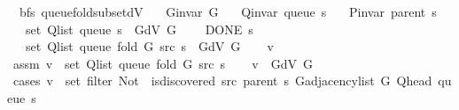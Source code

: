 \begin{isabellebody}
{}
\isamarkuptrue%
%
\endisatagdocument
{\isafolddocument}%
%
\isadelimdocument
%
\endisadelimdocument
{}\isamarkupfalse%
\ {\isacharparenleft}{\kern0pt}\ bfs{\isacharparenright}{\kern0pt}\ queue{\isacharunderscore}{\kern0pt}fold{\isacharunderscore}{\kern0pt}subset{\isacharunderscore}{\kern0pt}dV{\isacharcolon}{\kern0pt}\isanewline
\ \ \ {\isachardoublequoteopen}G{\isachardot}{\kern0pt}invar\ G{\isachardoublequoteclose}\isanewline
\ \ \ {\isachardoublequoteopen}Q{\isacharunderscore}{\kern0pt}invar\ {\isacharparenleft}{\kern0pt}queue\ s{\isacharparenright}{\kern0pt}{\isachardoublequoteclose}\isanewline
\ \ \ {\isachardoublequoteopen}P{\isacharunderscore}{\kern0pt}invar\ {\isacharparenleft}{\kern0pt}parent\ s{\isacharparenright}{\kern0pt}{\isachardoublequoteclose}\isanewline
\ \ \ {\isachardoublequoteopen}set\ {\isacharparenleft}{\kern0pt}Q{\isacharunderscore}{\kern0pt}list\ {\isacharparenleft}{\kern0pt}queue\ s{\isacharparenright}{\kern0pt}{\isacharparenright}{\kern0pt}\ {\isasymsubseteq}\ G{\isachardot}{\kern0pt}dV\ G{\isachardoublequoteclose}\isanewline
\ \ \ {\isachardoublequoteopen}{\isasymnot}\ DONE\ s{\isachardoublequoteclose}\isanewline
\ \ \ {\isachardoublequoteopen}set\ {\isacharparenleft}{\kern0pt}Q{\isacharunderscore}{\kern0pt}list\ {\isacharparenleft}{\kern0pt}queue\ {\isacharparenleft}{\kern0pt}fold\ G\ src\ s{\isacharparenright}{\kern0pt}{\isacharparenright}{\kern0pt}{\isacharparenright}{\kern0pt}\ {\isasymsubseteq}\ G{\isachardot}{\kern0pt}dV\ G{\isachardoublequoteclose}\isanewline
%
\isadelimproof
%
\endisadelimproof
%
\isatagproof
{}\isamarkupfalse%
\isanewline
\ \ \isamarkupfalse%
\ v\isanewline
\ \ \isamarkupfalse%
\ assm{\isacharcolon}{\kern0pt}\ {\isachardoublequoteopen}v\ {\isasymin}\ set\ {\isacharparenleft}{\kern0pt}Q{\isacharunderscore}{\kern0pt}list\ {\isacharparenleft}{\kern0pt}queue\ {\isacharparenleft}{\kern0pt}fold\ G\ src\ s{\isacharparenright}{\kern0pt}{\isacharparenright}{\kern0pt}{\isacharparenright}{\kern0pt}{\isachardoublequoteclose}\isanewline
\ \ \isamarkupfalse%
\ {\isachardoublequoteopen}v\ {\isasymin}\ G{\isachardot}{\kern0pt}dV\ G{\isachardoublequoteclose}\isanewline
\ \ \isamarkupfalse%
\ {\isacharparenleft}{\kern0pt}cases\ {\isachardoublequoteopen}v\ {\isasymin}\ set\ {\isacharparenleft}{\kern0pt}filter\ {\isacharparenleft}{\kern0pt}Not\ {\isasymcirc}\ is{\isacharunderscore}{\kern0pt}discovered\ src\ {\isacharparenleft}{\kern0pt}parent\ s{\isacharparenright}{\kern0pt}{\isacharparenright}{\kern0pt}\ {\isacharparenleft}{\kern0pt}G{\isachardot}{\kern0pt}adjacency{\isacharunderscore}{\kern0pt}list\ G\ {\isacharparenleft}{\kern0pt}Q{\isacharunderscore}{\kern0pt}head\ {\isacharparenleft}{\kern0pt}queue\ s{\isacharparenright}{\kern0pt}{\isacharparenright}{\kern0pt}{\isacharparenright}{\kern0pt}{\isacharparenright}{\kern0pt}{\isachardoublequoteclose}{\isacharparenright}{\kern0pt}\isanewline

\end{isabellebody}
